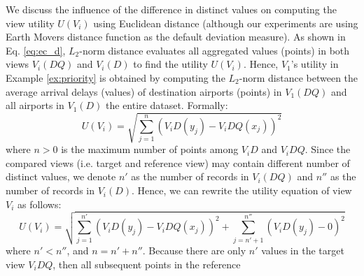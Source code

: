 We discuss the influence of the difference in distinct values on computing the view utility 
$U(V_i)$ using Euclidean distance (although our experiments are using Earth Movers distance function as the default deviation measure).
%
%
 As shown in Eq. \ref{eq:ec_d}, $L_2$-norm distance evaluates all aggregated values (points) in both views $V_i(DQ)$ and $V_i(D)$ to find the utility $U(V_i)$. 
%
Hence, $V_1$'s utility in Example \ref{ex:priority} is obtained by computing the $L_2$-norm distance between the average arrival delays (values) of destination airports (points) in $V_1(DQ)$ and all airports in $V_1(D)$ the entire dataset.
%
Formally:
%
\begin{equation}
\label{eq:ec_d}
U(V_i) = \sqrt{ \sum^{n}_{j=1}{(V_{i}D(y_j) - V_{i}DQ(x_j))^2}}
\end{equation}
%
where $n > 0$ is the maximum number of points among $V_{i}D$ and $V_{i}DQ$.
%
Since the compared views (i.e. target and reference view) may contain different number of distinct values, we denote $n'$ as the number of records in $V_i(DQ)$ 
and $n''$ as the number of records in $V_i(D)$.
%
Hence, we can rewrite the utility equation of view $V_i$ as follows:
%
\begin{equation}
\label{eq:ec_d2}
U(V_i) = \sqrt{ \sum^{n'}_{j=1}{(V_{i}D(y_j) - V_{i}DQ(x_j))^2} + \sum_{j=n'+1}^{n''}{(V_{i}D(y_j) - 0)^2} }
\end{equation}
%
where $n' < n''$, and $n = n' + n''$.
%
Because there are only $n'$ values in the target view $V_{i}DQ$, then all subsequent points in the reference 
